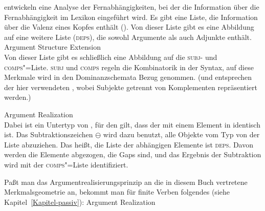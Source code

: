 \mbox{}\citet*{BMS2001a} entwickeln eine Analyse der Fernabhängigkeiten, bei der
die Information über die Fernabhängigkeit im Lexikon eingeführt wird. Es gibt
eine Liste, die Information über die Valenz eines Kopfes enthält (\argst).
Von dieser Liste gibt es eine Abbildung auf eine weitere Liste (\textsc{deps}),
die sowohl Argumente als auch Adjunkte enthält. 
\ea
Argument Structure Extension \citep*[]{BMS2001a}\\
 \impl {}
\z
Von dieser Liste gibt es schließlich eine Abbildung auf die \textsc{subj}- und \textsc{comps}"=Liste.
\textsc{subj} und \textsc{comps} regeln die Kombinatorik in der Syntax, auf diese Merkmale
wird in den Dominanzschemata Bezug genommen. (\subj und \comps entsprechen der hier verwendeten
\compsl, wobei Subjekte getrennt von Komplementen repräsentiert werden.)

\eas
Argument Realization \citep*[]{BMS2001a}\\
 \impl {} 
\zs
Dabei ist  ein Untertyp von , für den gilt, dass der \localw mit einem
Element in \slasch identisch ist. Das Subtraktionszeichen $\ominus$\is{$\ominus$}\isrel{$\ominus$} wird dazu benutzt, alle Objekte
vom Typ  von der Liste  abzuziehen. Das heißt, die Liste der abhängigen
Elemente ist \textsc{deps}. Davon werden die Elemente abgezogen, die Gaps sind, und das Ergebnis der Subtraktion wird mit der
\textsc{comps}"=Liste identifiziert.

Paßt man das
Argumentrealisierungsprinzip an die in diesem Buch vertretene Merkmalsgeometrie an,
bekommt man für finite Verben folgendes (siehe Kapitel~\ref{Kapitel-passiv}):
\ea
Argument Realization\\
 \impl {} 
\z


